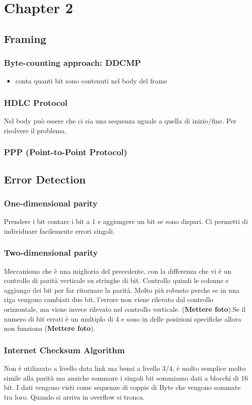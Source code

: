 \chapter{Chapter 2} \label{ch:Chapter2}
\section{Framing}
\subsection{Byte-counting approach: DDCMP}
\begin{itemize}
  \item conta quanti bit sono contenuti nel body del frame
\end{itemize}
\subsection{HDLC Protocol}
Nel body può essere che ci sia una sequenza uguale a quella di inizio/fine. Per risolvere il problema.
\subsection{PPP (Point-to-Point Protocol)}
\section{Error Detection}
\subsection{One-dimensional parity}
Prendere i bit contare i bit a 1 e aggiungere un bit se sono dispari. Ci permetti di individuare facilemente errori singoli.
\subsection{Two-dimensional parity}    
Meccanismo che è una miglioria del precedente, con la differenza che vi è un controllo di parità verticale su stringhe di bit. Controllo quindi le colonne e aggiungo dei bit per far ritornare la parità. Molto più robusto perche se in una riga vengono cambiati due bit, l'errore non viene rilevato dal controllo orizzontale, ma viene invece rilevato nel controllo verticale. (\textbf{Mettere foto}).Se il numero di bit errati è un multiplo di 4 e sono in delle posizioni specifiche allora non funziona (\textbf{Mettere foto}).
\subsection{Internet Checksum Algorithm}
Non è utilizzato a livello data link ma bensi a livello 3/4, è molto semplice molto simile alla parità ma anziche sommare i singoli bit sommiamo dati a blocchi di 16 bit. I dati vengono visti come sequenze di coppie di Byte che vengono sommate tra loro. Quando si arriva in overflow si tronca.
